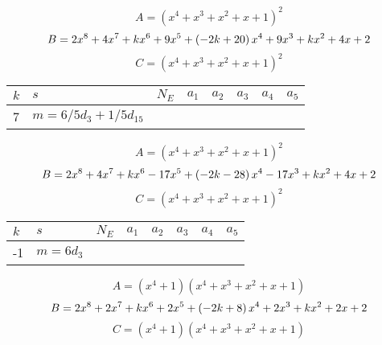 \documentclass{amsart}
\begin{document}
$$A=(x^4
 + x^3
 + x^2
 + x
 + 1)^{2}$$
$$B=2\*x^8
 + 4\*x^7
 + k\*x^6
 + 9\*x^5
 + \left(-2\*k
 + 20\right) \*x^4
 + 9\*x^3
 + k\*x^2
 + 4\*x
 + 2$$
$$C=(x^4
 + x^3
 + x^2
 + x
 + 1)^{2}$$
\begin{longtable}{|l|l|l|lllll|}
\hline
$k$ & $s$ & $N_E$ & $a_1$ & $a_2$ & $a_3$ & $a_4$ & $a_5$\\
\hline
7&$m=6/5d_{3}+1/5d_{15}$&&\multicolumn{5}{c|}{}\\
\hline
\end{longtable}
$$A=(x^4
 + x^3
 + x^2
 + x
 + 1)^{2}$$
$$B=2\*x^8
 + 4\*x^7
 + k\*x^6
 - 17\*x^5
 + \left(-2\*k
 - 28\right) \*x^4
 - 17\*x^3
 + k\*x^2
 + 4\*x
 + 2$$
$$C=(x^4
 + x^3
 + x^2
 + x
 + 1)^{2}$$
\begin{longtable}{|l|l|l|lllll|}
\hline
$k$ & $s$ & $N_E$ & $a_1$ & $a_2$ & $a_3$ & $a_4$ & $a_5$\\
\hline
-1&$m=6d_{3}$&&\multicolumn{5}{c|}{}\\
\hline
\end{longtable}
$$A=(x^4
 + 1)(x^4
 + x^3
 + x^2
 + x
 + 1)$$
$$B=2\*x^8
 + 2\*x^7
 + k\*x^6
 + 2\*x^5
 + \left(-2\*k
 + 8\right) \*x^4
 + 2\*x^3
 + k\*x^2
 + 2\*x
 + 2$$
$$C=(x^4
 + 1)(x^4
 + x^3
 + x^2
 + x
 + 1)$$
\end{document}
